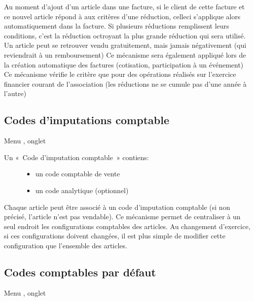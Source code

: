 \documentclass[a4paper,10pt,oneside,french]{sphinxmanual}
\begin{document}
Au moment d’ajout d’un article dans une facture, si le client de cette facture et ce nouvel article répond à aux critères d’une réduction,
celle\sphinxhyphen{}ci s’applique alors automatiquement dans la facture.
Si plusieurs réductions remplissent leurs conditions, c’est la réduction octroyant la plus grande réduction qui sera utilisé.
Un article peut se retrouver vendu gratuitement, mais jamais négativement (qui reviendrait à un remboursement)
Ce mécanisme sera également appliqué lors de la création automatique des factures (cotisation, participation à un événement)
Ce mécanisme vérifie le critère que pour des opérations réalisés sur l’exercice financier courant de l’association (les réductions ne se cumule pas d’une année à l’autre)


\subsection{Codes d’imputations comptable}
\label{\detokenize{invoice/configuration:codes-d-imputations-comptable}}
Menu , onglet 
\begin{description}
\item[{Un « Code d’imputation comptable » contiens:}] \leavevmode\begin{itemize}
\item {} 
un code comptable de vente

\item {} 
un code analytique (optionnel)

\end{itemize}

\end{description}

Chaque article peut être associé à un code d’imputation comptable (si non précisé, l’article n’est pas vendable).
Ce mécanisme permet de centraliser à un seul endroit les configurations comptables des articles.
Au changement d’exercice, si ces configurations doivent changées, il est plus simple de modifier cette configuration que l’ensemble des articles.


\subsection{Codes comptables par défaut}
\label{\detokenize{invoice/configuration:codes-comptables-par-defaut}}
Menu , onglet 
\end{document}
